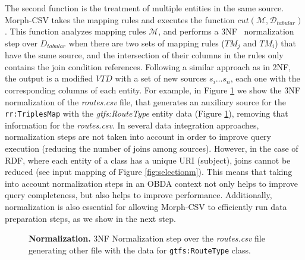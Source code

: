 The second function is the treatment of multiple entities in the same source. Morph-CSV takes the mapping rules and executes the function $cut(\mathcal{M},\mathcal{D}_{tabular})$. This function analyzes mapping rules $\mathcal{M}$, and performs a 3NF~\citep{codd1979extending} normalization step over ${D}_{tabular}$ when there are two sets of mapping rules ($TM_j$ and $TM_i$) that have the same source, and the intersection of their columns in the rules only contains the join condition references. Following a similar approach as in 2NF, the output is a modified $VTD$ with a set of new sources $s_i\ldots s_n$, each one with the corresponding columns of each entity. For example, in Figure \ref{fig:normalization} we show the 3NF normalization of the \textit{routes.csv} file, that generates an auxiliary source for the \texttt{rr:TriplesMap} with the \textit{gtfs:RouteType} entity data (Figure \ref{fig:normalization}), removing that information for the \textit{routes.csv}. In several data integration approaches, normalization steps are not taken into account in order to improve query execution (reducing the number of joins among sources). However, in the case of RDF, where each entity of a class has a unique URI (subject),  joins cannot be reduced (see input mapping of Figure \ref{fig:selectionm}). This means that taking into account normalization steps in an OBDA context not only helps to improve query completeness, but also helps to improve performance. Additionally, normalization is also essential for allowing Morph-CSV to efficiently run data preparation steps, as we show in the next step.

\begin{figure}[ht]
\centering
{}
\caption[Normalization step]{\textbf{Normalization.} 3NF Normalization step over the \textit{routes.csv} file generating other file with the data for \texttt{gtfs:RouteType} class.}
\label{fig:normalization}
\end{figure}

